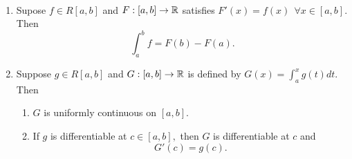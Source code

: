\begin{theorem} \leavevmode \\
    \label{Thm6.20}
    \begin{enumerate}
        \item Supose $f \in R[a,b]$ and $F:[a,b] \to \mathbb{R}$ satisfies $F'(x) = f(x) ~~\forall x \in [a,b]$. Then
        $$\int_a^b f = F(b) - F(a).$$
        \item Suppose $g \in R[a,b]$ and $G:[a,b] \to \mathbb{R}$ is defined by $G(x) = \int_a^xg(t) dt.$ Then
        \begin{enumerate}
            \item[(1)] $G$ is uniformly continuous on $[a,b]$.
            \item[(2)] If $g$ is differentiable at $c \in [a,b],$ then $G$ is differentiable at $c$ and 
            $$G'(c) = g(c).$$ 
        \end{enumerate}
    \end{enumerate}
\end{theorem}

